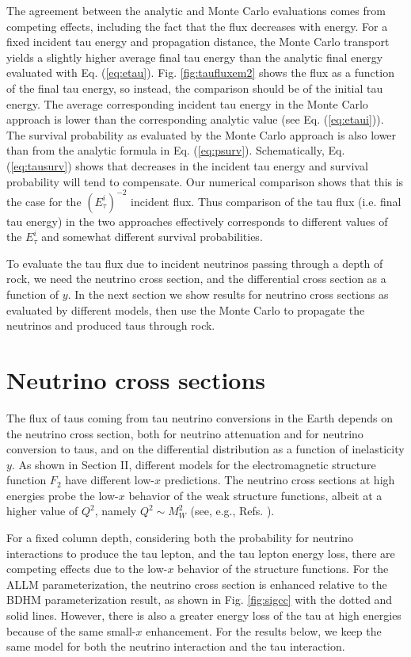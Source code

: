 \documentclass[aps,10pt,twocolumn,tightenlines]{revtex4-1}
\begin{document}
The agreement between the analytic and Monte Carlo evaluations comes from competing effects, including the fact that the flux decreases with energy.
For a fixed incident tau energy and propagation distance, the Monte Carlo transport yields a slightly higher average final tau energy 
than the analytic final energy 
evaluated with Eq. (\ref{eq:etau}). Fig. \ref{fig:taufluxem2} shows the flux as a function of the final tau energy, so instead, the comparison should be of the initial tau energy. The average corresponding incident tau energy in the Monte Carlo approach is lower than the corresponding analytic value (see Eq. (\ref{eq:etaui})). The survival probability as evaluated by the Monte Carlo approach is also lower than from the analytic formula in
Eq. (\ref{eq:psurv}). Schematically, Eq. (\ref{eq:tausurv}) shows that decreases in the incident tau energy and survival probability will tend to compensate. Our numerical comparison shows that this is the case for the $(E_\tau^i)^{-2}$ incident flux.
Thus comparison of the tau flux (i.e. final tau energy) in the two approaches
effectively corresponds to different values of the $E_\tau^i$ and somewhat different survival probabilities.

To evaluate the tau flux due to incident neutrinos passing through a depth of rock, we need the neutrino cross section, and the differential cross section as a function of $y$. In the next section we show results for neutrino cross sections as evaluated by different models, then use the Monte Carlo to propagate the neutrinos and produced taus through rock. 


\section{Neutrino cross sections}

The flux of taus coming from tau neutrino conversions in the Earth depends on the neutrino cross section, both for
neutrino attenuation and for neutrino conversion to taus, and on the differential distribution as a function of inelasticity $y$.
As shown in Section II, different models for the electromagnetic structure function $F_2$ have different low-$x$ predictions. 
The neutrino cross sections at high energies probe the low-$x$ behavior of the weak structure functions, albeit at a higher value of $Q^2$, namely $Q^2\sim M_W^2$ (see, e.g., Refs. \cite{Gandhi:1998ri,Reno:2004cx}). 

For a fixed column depth, considering both the probability for neutrino interactions to produce the tau lepton, and
the tau lepton energy loss, there are competing effects due to the low-$x$ behavior of the structure functions. For the ALLM parameterization, the neutrino cross section is enhanced relative to the BDHM parameterization result, 
as shown in Fig. \ref{fig:sigcc} with the dotted and solid lines. However, there is also
a greater energy loss of the tau at high energies because of the same small-$x$ enhancement. For the results below,
we keep the same model for both the neutrino interaction and the tau interaction.
\end{document}
